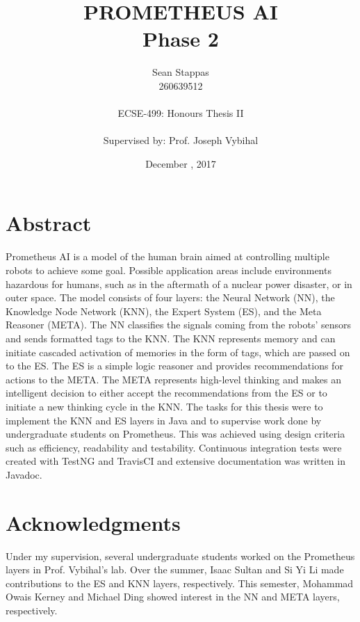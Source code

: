 \documentclass[titlepage,11pt]{article}
\title
{
	\uppercase{Prometheus AI} \\
	\large Phase 2
}
\author %
{
	Sean Stappas \\ 
	260639512 \\
	\\ 
	ECSE-499: Honours Thesis II \\
	\\
	\small Supervised by: Prof. Joseph Vybihal
}
\date{December \nth{7}, 2017}
\begin{document}
	
\sloppy

\maketitle

\section*{Abstract}
Prometheus AI is a model of the human brain aimed at controlling multiple robots to achieve some goal. Possible application areas include environments hazardous for humans, such as in the aftermath of a nuclear power disaster, or in outer space. The model consists of four layers: the Neural Network (NN), the Knowledge Node Network (KNN), the Expert System (ES), and the Meta Reasoner (META). The NN classifies the signals coming from the robots' sensors and sends formatted tags to the KNN. The KNN represents memory and can initiate cascaded activation of memories in the form of tags, which are passed on to the ES. The ES is a simple logic reasoner and provides recommendations for actions to the META. The META represents high-level thinking and makes an intelligent decision to either accept the recommendations from the ES or to initiate a new thinking cycle in the KNN. The tasks for this thesis were to implement the KNN and ES layers in Java and to supervise work done by undergraduate students on Prometheus. This was achieved using design criteria such as efficiency, readability and testability. Continuous integration tests were created with TestNG and TravisCI and extensive documentation was written in Javadoc.

\section*{Acknowledgments}
Under my supervision, several undergraduate students worked on the Prometheus layers in Prof. Vybihal's lab. Over the summer, Isaac Sultan and Si Yi Li made contributions to the ES and KNN layers, respectively. This semester, Mohammad Owais Kerney and Michael Ding showed interest in the NN and META layers, respectively.
\end{document}

